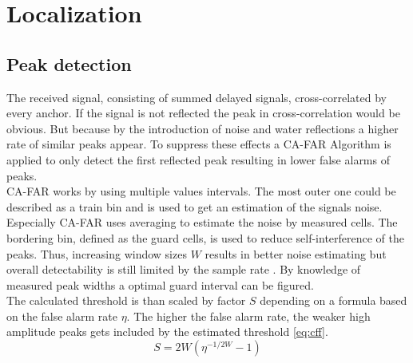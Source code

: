 \chapter{Localization}

\section{Peak detection}

The received signal, consisting of summed delayed signals, cross-correlated by every anchor. If the signal is not reflected the peak in cross-correlation would be obvious. But because by the introduction of noise and water reflections a higher rate of similar peaks appear. To suppress these effects a CA-FAR Algorithm \cite{rohling11} is applied to only detect the first reflected peak resulting in lower false alarms of peaks. \\
CA-FAR works by using multiple values intervals. The most outer one could be described as a train bin and is used to get an estimation of the signals noise. Especially CA-FAR uses averaging to estimate the noise by measured cells. The bordering bin, defined as the guard cells, is used to reduce self-interference of the peaks. Thus, increasing window sizes $W$ results in better noise estimating but overall detectability is still limited by the sample rate  \cite{rohling11}\cite{radarbasics}. By knowledge of measured peak widths a optimal guard interval can be figured.\\
The calculated threshold is than scaled by factor $S$ depending on a formula based on the false alarm rate $\eta$. The higher the false alarm rate, the weaker high amplitude peaks gets included by the estimated threshold \ref{eq:cff}.\\

%
\begin{equation}
	S=2W\left( \eta^{-1/{2W}}-1\right) 
	\label{eq:cff}
\end{equation}

